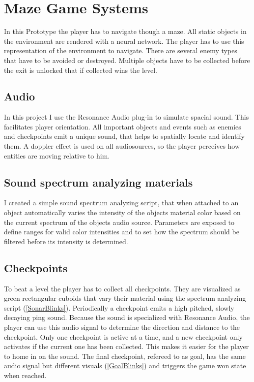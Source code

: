 
\chapter{Maze Game Systems}\label{MazeGameSystems}
 In this Prototype the player has to navigate though a maze. All static objects in the environment are rendered with a neural network. The player has to use this representation of the environment to navigate. There are several enemy types that have to be avoided or destroyed. Multiple objects have to be collected before the exit is unlocked that if collected wins the level.

\section{Audio}
In this project I use the Resonance Audio plug-in to simulate spacial sound. This facilitates player orientation. All important objects and events such as enemies and checkpoints emit a unique sound, that helps to spatially locate and identify them. A doppler effect is used on all audiosources, so the player perceives how entities are moving relative to him.


\section{Sound spectrum analyzing materials}
I created a simple sound spectrum analyzing script, that when attached to an object automatically varies the intensity of the objects material color based on the current spectrum of the objects audio source. Parameters are exposed to define ranges for valid color intensities and to set how the spectrum should be filtered before its intensity is determined.


\section{Checkpoints}
To beat a level the player has to collect all checkpoints. They are visualized as green rectangular cuboids that vary their material using the spectrum analyzing script (\cref{SonarBlinks}). Periodically a checkpoint emits a high pitched, slowly decaying ping sound. Because the sound is specialized with Resonance Audio, the player can use this audio signal to determine the direction and distance to the checkpoint. Only one checkpoint is active at a time, and a new checkpoint only activates if the current one has been collected. This makes it easier for the player to home in on the sound. The final checkpoint, refereed to as goal, has the same audio signal but different visuals (\cref{GoalBlinks}) and triggers the game won state when reached.

